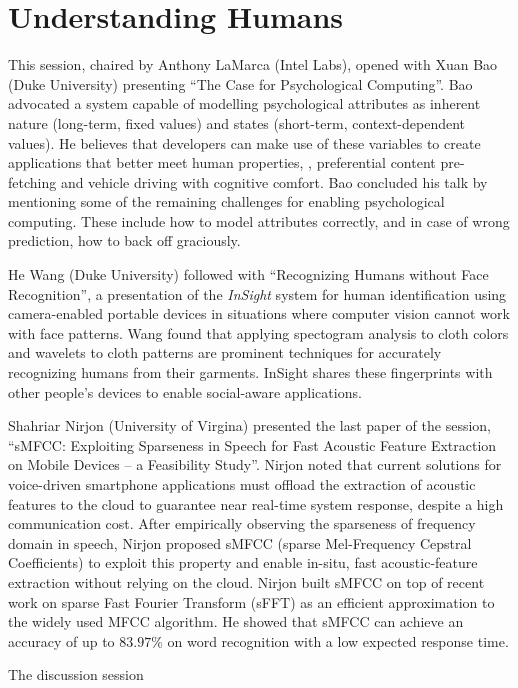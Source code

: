 \section{Understanding Humans}
\label{sec:humans}

This session, chaired by Anthony LaMarca (Intel Labs), opened with Xuan
Bao (Duke University) presenting ``The Case for Psychological
Computing''. Bao advocated a system capable of modelling psychological
attributes as inherent nature (long-term, fixed values) and states
(short-term, context-dependent values). He believes that developers can
make use of these variables to create applications that better meet
human properties, \eg, preferential content pre-fetching and vehicle
driving with cognitive comfort. Bao concluded his talk by mentioning
some of the remaining challenges for enabling psychological computing.
These include how to model attributes correctly, and in case of wrong
prediction, how to back off graciously.

He Wang (Duke University) followed with ``Recognizing Humans without Face
Recognition'', a presentation of the \emph{InSight} system for human
identification using camera-enabled portable devices in situations where
computer vision cannot work with face patterns. Wang found that
applying spectogram analysis to cloth colors and wavelets to cloth
patterns are prominent techniques for accurately recognizing humans from
their garments. InSight shares these fingerprints with other people's
devices to enable social-aware applications.

Shahriar Nirjon (University of Virgina) presented the last paper of
the session, ``sMFCC: Exploiting Sparseness in Speech for Fast Acoustic
Feature Extraction on Mobile Devices -- a Feasibility Study''. Nirjon
noted that current solutions for voice-driven smartphone applications
must offload the extraction of acoustic features to the cloud to
guarantee near real-time system response, despite a high communication
cost. After empirically observing the sparseness of frequency domain in
speech, Nirjon proposed sMFCC (sparse Mel-Frequency Cepstral
Coefficients) to exploit this property and enable in-situ, fast
acoustic-feature extraction without relying on the cloud. Nirjon built
sMFCC on top of recent work on sparse Fast Fourier Transform (sFFT) as
an efficient approximation to the widely used MFCC algorithm. He showed
that sMFCC can achieve an accuracy of up to $83.97\%$ on word
recognition with a low expected response time.

The discussion session
